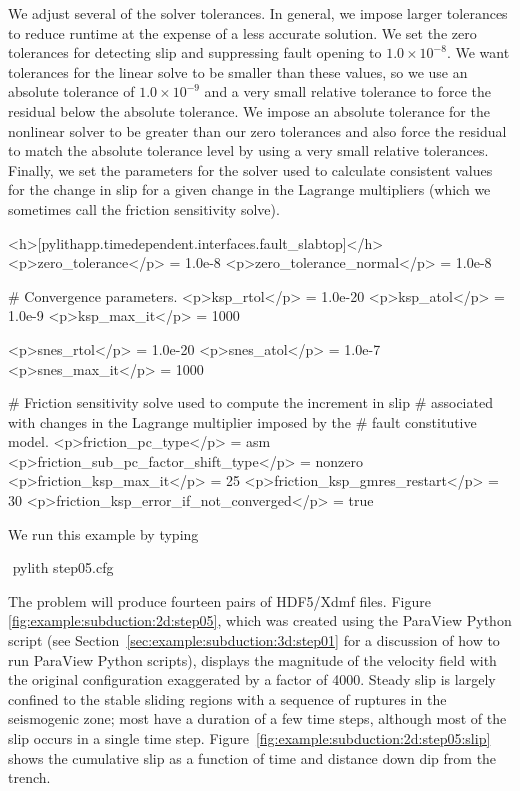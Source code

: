We adjust several of the solver tolerances. In general, we impose
larger tolerances to reduce runtime at the expense of a less accurate
solution. We set the zero tolerances for detecting slip and
suppressing fault opening to $1.0 \times 10^{-8}$. We want tolerances
for the linear solve to be smaller than these values, so we use an
absolute tolerance of $1.0 \times 10^{-9}$ and a very small relative
tolerance to force the residual below the absolute tolerance. We
impose an absolute tolerance for the nonlinear solver to be greater
than our zero tolerances and also force the residual to match the
absolute tolerance level by using a very small relative
tolerances. Finally, we set the parameters for the solver used to
calculate consistent values for the change in slip for a given change
in the Lagrange multipliers (which we sometimes call the friction
sensitivity solve).
\begin{cfg}
<h>[pylithapp.timedependent.interfaces.fault_slabtop]</h>
<p>zero_tolerance</p> = 1.0e-8
<p>zero_tolerance_normal</p> = 1.0e-8

# Convergence parameters.
<p>ksp_rtol</p> = 1.0e-20
<p>ksp_atol</p> = 1.0e-9
<p>ksp_max_it</p> = 1000

<p>snes_rtol</p> = 1.0e-20
<p>snes_atol</p> = 1.0e-7
<p>snes_max_it</p> = 1000

# Friction sensitivity solve used to compute the increment in slip
# associated with changes in the Lagrange multiplier imposed by the
# fault constitutive model.
<p>friction_pc_type</p> = asm
<p>friction_sub_pc_factor_shift_type</p> = nonzero
<p>friction_ksp_max_it</p> = 25
<p>friction_ksp_gmres_restart</p> = 30
<p>friction_ksp_error_if_not_converged</p> = true
\end{cfg}

We run this example by typing
\begin{shell}
$$ pylith step05.cfg
\end{shell}
The problem will produce fourteen pairs of HDF5/Xdmf files. Figure
\vref{fig:example:subduction:2d:step05}, which was created using the
ParaView Python script  (see
Section~\ref{sec:example:subduction:3d:step01} for a discussion of how
  to run ParaView Python scripts), displays the
magnitude of the velocity field with the original configuration
exaggerated by a factor of 4000. Steady slip is largely confined to
the stable sliding regions with a sequence of ruptures in the
seismogenic zone; most have a duration of a few time steps, although
most of the slip occurs in a single time
step. Figure~\ref{fig:example:subduction:2d:step05:slip} shows the
cumulative slip as a function of time and distance down dip from the
trench.

